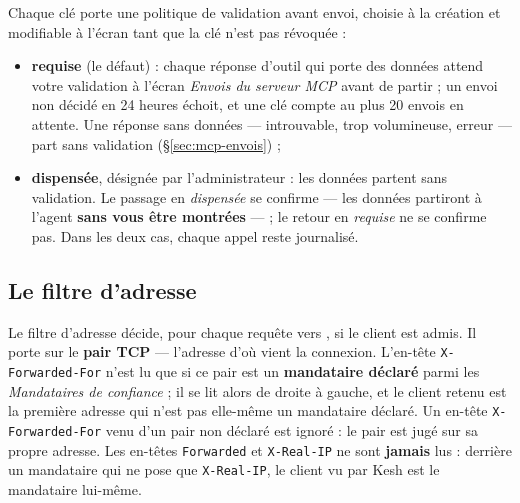 \documentclass[a4paper,11pt,oneside]{article}
\begin{document}
Chaque clé porte une politique de validation avant envoi, choisie à la création et modifiable à l'écran tant que la clé n'est pas révoquée :
\begin{itemize}
    \item \textbf{requise} (le défaut) : chaque réponse d'outil qui porte des données attend votre validation à l'écran \emph{Envois du serveur MCP} avant de partir ; un envoi non décidé en 24 heures échoit, et une clé compte au plus 20 envois en attente. Une réponse sans données --- introuvable, trop volumineuse, erreur --- part sans validation (\S\ref{sec:mcp-envois}) ;
    \item \textbf{dispensée}, désignée par l'administrateur : les données partent sans validation. Le passage en \emph{dispensée} se confirme --- les données partiront à l'agent \textbf{sans vous être montrées} --- ; le retour en \emph{requise} ne se confirme pas. Dans les deux cas, chaque appel reste journalisé.
\end{itemize}

\subsection{Le filtre d'adresse}\label{sec:mcp-filtre}

Le filtre d'adresse décide, pour chaque requête vers , si le client est admis. Il porte sur le \textbf{pair TCP} --- l'adresse d'où vient la connexion. L'en-tête \texttt{X-Forwarded-For} n'est lu que si ce pair est un \textbf{mandataire déclaré} parmi les \emph{Mandataires de confiance} ; il se lit alors de droite à gauche, et le client retenu est la première adresse qui n'est pas elle-même un mandataire déclaré. Un en-tête \texttt{X-Forwarded-For} venu d'un pair non déclaré est ignoré : le pair est jugé sur sa propre adresse. Les en-têtes \texttt{Forwarded} et \texttt{X-Real-IP} ne sont \textbf{jamais} lus : derrière un mandataire qui ne pose que \texttt{X-Real-IP}, le client vu par Kesh est le mandataire lui-même.
\end{document}
